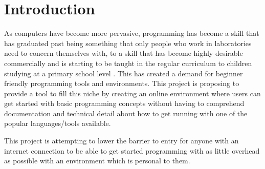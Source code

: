 \chapter{Introduction}

As computers have become more pervasive, programming has become a skill that has graduated past being something that only people who work in laboratories need to concern themselves with, to a skill that has become highly desirable commercially and is starting to be taught in the regular curriculum to children studying at a primary school level \cite{schools}. This has created a demand for beginner friendly programming tools and environments. This project is proposing to provide a tool to fill this niche by creating an online environment where users can get started with basic programming concepts without having to comprehend documentation and technical detail about how to get running with one of the popular languages/tools available.

This project is attempting to lower the barrier to entry for anyone with an internet connection to be able to get started programming with as little overhead as possible with an environment which is personal to them.

\pagebreak

